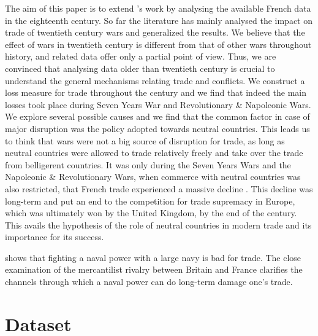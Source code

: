 \documentclass[12pt,a4paper,notitlepage,english]{article}
\begin{document}
The aim of this paper is to extend \cite{Riley1986}’s work by analysing the available French data in the eighteenth century.
So far the literature has mainly analysed the impact on trade of twentieth century wars and generalized the results.
We believe that the effect of wars in twentieth century is different from that of other wars throughout history, and related data offer only a partial point of view.
Thus, we are convinced that analysing data older than twentieth century is crucial to understand the general mechanisms relating trade and conflicts.
We construct a loss measure for trade throughout the century and we find that indeed the main losses took place during Seven Years War and Revolutionary \& Napoleonic Wars.
We explore several possible causes and we find that the common factor in case of major disruption was the policy adopted towards neutral countries.
This leads us to think that wars were not a big source of disruption for trade, as long as neutral countries were allowed to trade relatively freely and take over the trade from belligerent countries.
It was only during the Seven Years Wars and the Napoleonic \& Revolutionary Wars, when commerce with neutral countries was also restricted, that French trade experienced a massive decline \citep{Findlay2009}.
This decline was long-term and put an end to the competition for trade supremacy in Europe, which was ultimately won by the United Kingdom, by the end of the century.
This avails the hypothesis of the role of neutral countries in modern trade and its importance for its success.


\cite{Rahman2010}  shows that fighting a naval power with a large navy is bad for trade. The close examination of the mercantilist rivalry between Britain and France clarifies the channels through which a naval power can do long-term damage one's trade.



\section{Dataset} \label{dataset}
\end{document}
